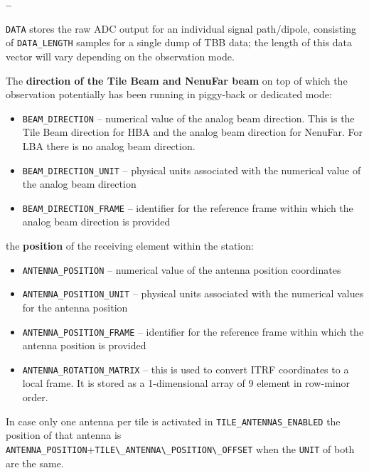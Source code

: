 \documentclass[a4paper,10pt,bibtotoc]{scrartcl}
\begin{document}
\begin{list}{\textbf{--}}{}
\item \verb|DATA| stores the raw ADC output for an individual signal path/dipole,
  consisting of \verb|DATA_LENGTH| samples for a single dump of TBB data; the
  length of this data vector will vary depending on the observation mode. \\
\item The \textbf{direction of the Tile Beam and NenuFar beam} on top of which the observation
  potentially has been running in piggy-back or dedicated mode:
  \begin{itemize} \parskip 0pt
  \item \verb|BEAM_DIRECTION| -- numerical value of the analog beam direction. This is the Tile Beam direction for HBA and the analog beam direction for NenuFar. For LBA there is no analog beam direction.
  \item \verb|BEAM_DIRECTION_UNIT| -- physical units associated with the numerical
    value of the analog beam direction
  \item \verb|BEAM_DIRECTION_FRAME| -- identifier for the reference frame within
    which the analog beam direction is provided
  \end{itemize}
\item the \textbf{position} of the receiving element within the station:
  \begin{itemize} \parskip 0pt
  \item \verb|ANTENNA_POSITION| -- numerical value of the antenna position
    coordinates
  \item \verb|ANTENNA_POSITION_UNIT| -- physical units associated with the numerical
    values for the antenna position
  \item \verb|ANTENNA_POSITION_FRAME| -- identifier for the reference frame within
    which the antenna position is provided
  \item \verb|ANTENNA_ROTATION_MATRIX| -- this is used to convert ITRF
    coordinates to a local frame. It is stored as a 1-dimensional array of 9
    element in row-minor order.
  \end{itemize}


  In case only one antenna per tile is activated in \verb|TILE_ANTENNAS_ENABLED| the position of that antenna is \verb|ANTENNA_POSITION|+\verb|TILE\_ANTENNA\_POSITION\_OFFSET| when the \verb|UNIT| of both are the same.
  

\end{list}
\end{document}
